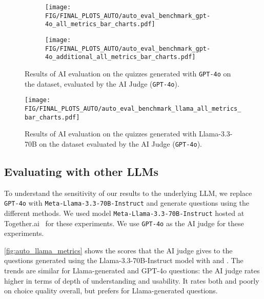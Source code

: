 \begin{figure*}[t]
    \centering
    \begin{subfigure}{\linewidth}
        \centering
        \texttt{[image: FIG/FINAL\_PLOTS\_AUTO/auto\_eval\_benchmark\_gpt-4o\_all\_metrics\_bar\_charts.pdf]}
        \label{fig:auto_gpt_primary}
    \end{subfigure}
    \begin{subfigure}{\linewidth}
        \centering
        \texttt{[image: FIG/FINAL\_PLOTS\_AUTO/auto\_eval\_benchmark\_gpt-4o\_additional\_all\_metrics\_bar\_charts.pdf]}
        \label{fig:auto_gpt_additional}
    \end{subfigure}
    \caption{Results of AI evaluation on the quizzes generated with \texttt{GPT-4o} on the \arxiv dataset, evaluated by the AI Judge (\texttt{GPT-4o}).}
    \label{fig:auto_gpt_metrics}
\end{figure*}

\begin{figure}[t]
        \centering
            \texttt{[image: FIG/FINAL\_PLOTS\_AUTO/auto\_eval\_benchmark\_llama\_all\_metrics\_bar\_charts.pdf]}
        \caption{Results of AI evaluation on the quizzes generated with Llama-3.3-70B on the \arxiv dataset evaluated by the AI Judge (\texttt{GPT-4o}).}
        \label{fig:auto_llama_metrics}
    \end{figure}


\subsection{Evaluating \name with other LLMs}
\label{subsec:ablation-model}
To understand the sensitivity of our results to the underlying LLM, we replace \texttt{GPT-4o} with \texttt{Meta-Llama-3.3-70B-Instruct} and generate questions using the different methods. We used model \texttt{Meta-Llama-3.3-70B-Instruct} hosted at Together.ai~\citep{together_ai_api} for these experiments. We use \texttt{GPT-4o} as the AI judge for these experiments. 


\autoref{fig:auto_llama_metrics} shows the scores that the AI judge gives to the questions generated using the Llama-3.3-70B-Instruct model with \Baseline and \name. The trends are similar for Llama-generated and GPT-4o questions: the AI judge rates \name higher in terms of depth of understanding and usability. It rates both \Baseline and \name poorly on choice quality overall, but prefers \Baseline for Llama-generated questions. 

